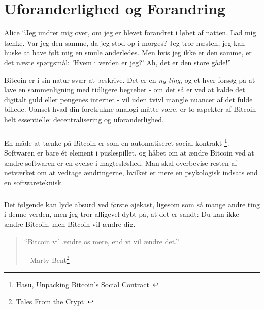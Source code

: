 \chapter{Uforanderlighed og Forandring}
\label{les:1}

\begin{chapquote}{Alice}
\enquote{Jeg undrer mig over, om jeg er blevet forandret i løbet af natten. Lad 
mig tænke. Var jeg den samme, da jeg stod op i morges? Jeg tror næsten, jeg kan 
huske at have følt mig en smule anderledes. Men hvis jeg ikke er den samme, er 
det næste spørgsmål: 'Hvem i verden er jeg?' Ah, det er den store gåde!}
\end{chapquote}

Bitcoin er i sin natur svær at beskrive. Det er en \textit{ny ting}, og et hver
forsøg på at lave en sammenligning med tidligere begreber - om det så er ved at 
kalde det digitalt guld eller pengenes internet - vil uden tvivl mangle nuancer 
af det fulde billede. Uanset hvad din foretrukne analogi måtte være, er to 
aspekter af Bitcoin helt essentielle: decentralisering og uforanderlighed.

\paragraph{}
En måde at tænke på Bitcoin er som en automatiseret social kontrakt
\footnote{Hasu, Unpacking Bitcoin's Social Contract~\cite{social-contract}}. 
Softwaren er bare ét element i puslespillet, og håbet om at ændre Bitcoin ved 
at ændre softwaren er en øvelse i magtesløshed. Man skal overbevise resten af
netværket om at vedtage ændringerne, hvilket er mere en psykologisk indsats end 
en softwareteknisk.

\paragraph{}
Det følgende kan lyde absurd ved første øjekast, ligesom som så mange andre 
ting i denne verden, men jeg tror alligevel dybt på, at det er sandt: Du
kan ikke ændre Bitcoin, men Bitcoin vil ændre dig.

\begin{quotation}\begin{samepage}
\enquote{Bitcoin vil ændre os mere, end vi vil ændre det.}
\begin{flushright} -- Marty Bent\footnote{Tales From the Crypt~\cite{tftc21}}
\end{flushright}\end{samepage}\end{quotation}

